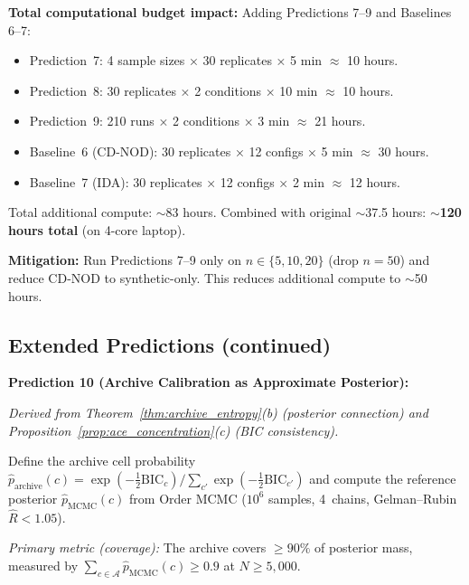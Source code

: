 \documentclass{article}
\theoremstyle{definition}
\theoremstyle{plain}
\theoremstyle{remark}
\begin{document}
\textbf{Total computational budget impact:} Adding Predictions 7--9 and Baselines 6--7:
\begin{itemize}
  \item Prediction~7: 4 sample sizes × 30 replicates × 5 min $\approx$ 10 hours.
  \item Prediction~8: 30 replicates × 2 conditions × 10 min $\approx$ 10 hours.
  \item Prediction~9: 210 runs × 2 conditions × 3 min $\approx$ 21 hours.
  \item Baseline~6 (CD-NOD): 30 replicates × 12 configs × 5 min $\approx$ 30 hours.
  \item Baseline~7 (IDA): 30 replicates × 12 configs × 2 min $\approx$ 12 hours.
\end{itemize}
Total additional compute: $\sim$83 hours. Combined with original $\sim$37.5 hours:
\textbf{$\sim$120 hours total} (on 4-core laptop).

\textbf{Mitigation:} Run Predictions 7--9 only on $n \in \{5, 10, 20\}$ (drop $n = 50$)
and reduce CD-NOD to synthetic-only. This reduces additional compute to $\sim$50 hours.



\subsection*{Extended Predictions (continued)}

\textbf{Prediction 10 (Archive Calibration as Approximate Posterior):}
\label{pred:calibration}

\emph{Derived from Theorem~\ref{thm:archive_entropy}(b) (posterior
connection) and Proposition~\ref{prop:ace_concentration}(c) (BIC
consistency).}

Define the archive cell probability
$\hat{p}_{\mathrm{archive}}(c) = \exp(-\tfrac{1}{2}\mathrm{BIC}_c) /
\sum_{c'} \exp(-\tfrac{1}{2}\mathrm{BIC}_{c'})$ and compute the reference
posterior $\hat{p}_{\mathrm{MCMC}}(c)$ from Order MCMC ($10^6$ samples,
4~chains, Gelman--Rubin $\hat{R} < 1.05$).

\emph{Primary metric (coverage):} The archive covers $\geq 90\%$ of
posterior mass, measured by
$\sum_{c \in \mathcal{A}} \hat{p}_{\mathrm{MCMC}}(c) \geq 0.9$ at
$N \geq 5{,}000$.
\end{document}
